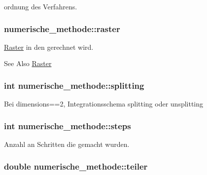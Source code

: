 ordnung des Verfahrens. \hypertarget{classnumerische__methode_ad68a4b94b3246043db399adf04959ab6}{
\subsubsection[{raster}]{ numerische\-\_\-methode\-::raster\hspace{0.3cm}{\ttfamily [protected]}}}\label{classnumerische__methode_ad68a4b94b3246043db399adf04959ab6}
\hyperlink{classRaster}{Raster} in den gerechnet wird. \begin{DoxySeeAlso}{See Also}
\hyperlink{classRaster}{Raster} 
\end{DoxySeeAlso}
\hypertarget{classnumerische__methode_a70e5afff7bb50109856ce5bf2e62f072}{
\subsubsection[{splitting}]{\setlength{\rightskip}{0pt plus 5cm}int numerische\-\_\-methode\-::splitting\hspace{0.3cm}{\ttfamily [protected]}}}\label{classnumerische__methode_a70e5afff7bb50109856ce5bf2e62f072}
Bei dimensions==2, Integrationsschema splitting oder unsplitting \hypertarget{classnumerische__methode_a4c5bac9002b5bc6ab4c5eac30943246a}{
\subsubsection[{steps}]{\setlength{\rightskip}{0pt plus 5cm}int numerische\-\_\-methode\-::steps\hspace{0.3cm}{\ttfamily [protected]}}}\label{classnumerische__methode_a4c5bac9002b5bc6ab4c5eac30943246a}
Anzahl an Schritten die gemacht wurden. \hypertarget{classnumerische__methode_ae3738842c0b0203293161f8389454227}{
\subsubsection[{teiler}]{\setlength{\rightskip}{0pt plus 5cm}double numerische\-\_\-methode\-::teiler\hspace{0.3cm}{\ttfamily [protected]}}}\label{classnumerische__methode_ae3738842c0b0203293161f8389454227}
